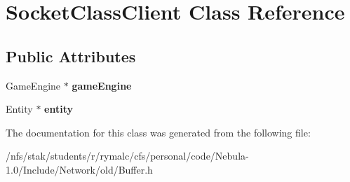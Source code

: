 \hypertarget{classSocketClassClient}{
\section{SocketClassClient Class Reference}
\label{classSocketClassClient}
}
\subsection*{Public Attributes}
\begin{DoxyCompactItemize}
\item 
\hypertarget{classSocketClassClient_ae253b1431f8be433705ce8d46822043b}{
GameEngine $\ast$ {\bfseries gameEngine}}
\label{classSocketClassClient_ae253b1431f8be433705ce8d46822043b}

\item 
\hypertarget{classSocketClassClient_afaccb9c5f4c11cc0750157f7b151ed32}{
Entity $\ast$ {\bfseries entity}}
\label{classSocketClassClient_afaccb9c5f4c11cc0750157f7b151ed32}

\end{DoxyCompactItemize}


The documentation for this class was generated from the following file:\begin{DoxyCompactItemize}
\item 
/nfs/stak/students/r/rymalc/cfs/personal/code/Nebula-\/1.0/Include/Network/old/Buffer.h\end{DoxyCompactItemize}
